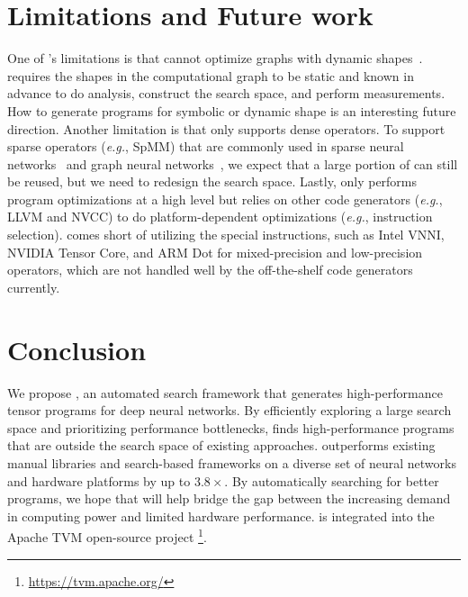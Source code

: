 \section{Limitations and Future work}
\label{sec:limitation}
One of \Ansor's limitations is that \Ansor cannot optimize graphs with dynamic shapes~\cite{shen2020nimble}.
\Ansor requires the shapes in the computational graph to be static and known in advance
to do analysis, construct the search space, and perform measurements. How to generate programs for symbolic or dynamic shape is an interesting future direction.
Another limitation is that \Ansor only supports dense operators. 
To support sparse operators (\textit{e.g.}, SpMM) that are commonly used in sparse neural networks~\cite{gale2019state} and graph neural networks~\cite{hu2020featgraph}, we expect that a large portion of \Ansor can still be reused, but we need to redesign the search space.
Lastly, \Ansor only performs program optimizations at a high level but relies on other code generators (\textit{e.g.}, LLVM and NVCC) to do platform-dependent optimizations ({\textit{e.g.}, instruction selection}). \Ansor comes short of utilizing the special instructions, such as Intel VNNI, NVIDIA Tensor Core, and ARM Dot for mixed-precision and low-precision operators, which are not handled well by the off-the-shelf code generators currently.

\section{Conclusion}
\label{sec:conclusion}

We propose \Ansor, an automated search framework that generates high-performance tensor programs for deep neural networks. 
By efficiently exploring a large search space and prioritizing performance bottlenecks,
\Ansor finds high-performance programs that are outside the search space of existing approaches.
\Ansor outperforms existing manual libraries and search-based frameworks on a diverse set of neural networks and hardware platforms by up to $3.8 \times$.
By automatically searching for better programs, we hope that \Ansor will help bridge the gap between the increasing demand in computing power and limited hardware performance.
\Ansor is integrated into the Apache TVM open-source project \footnote{\url{https://tvm.apache.org/}}.
